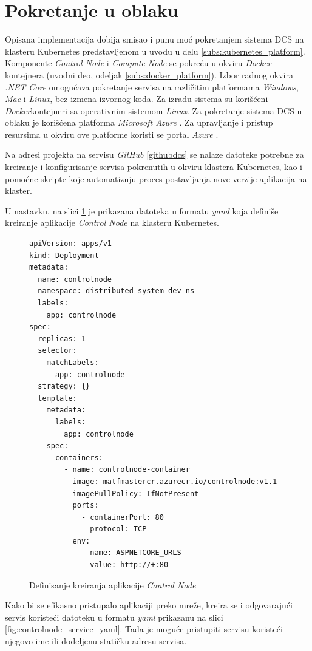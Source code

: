 \documentclass[12pt,oneside]{memoir}
\begin{document}
\section{Pokretanje u oblaku}

Opisana implementacija dobija smisao i punu moć pokretanjem sistema DCS na klasteru Kubernetes predstavljenom u uvodu u delu \ref{subs:kubernetes_platform}. Komponente \emph{Control Node} i \emph{Compute Node} se pokreću u okviru \emph{Docker} kontejnera (uvodni deo, odeljak \ref{subs:docker_platform}). Izbor radnog okvira \emph{.NET Core} omogućava pokretanje servisa na različitim platformama \emph{Windows}, \emph{Mac} i \emph{Linux}, bez izmena izvornog koda. Za izradu sistema su korišćeni \emph{Docker}kontejneri sa operativnim sistemom \emph{Linux}. Za pokretanje sistema DCS u oblaku je korišćena platforma \emph{Microsoft Azure} \cite{Azure}. Za upravljanje i pristup resursima u okviru ove platforme koristi se portal \emph{Azure} \cite{AzurePortal}.

Na adresi projekta na servisu \emph{GitHub} \ref{githubdcs} se nalaze datoteke potrebne za kreiranje i konfigurisanje servisa pokrenutih u okviru klastera Kubernetes, kao i pomoćne skripte koje automatizuju proces postavljanja nove verzije aplikacija na klaster.

U nastavku, na slici \ref{fig:controlnode_yaml} je prikazana datoteka u formatu \emph{yaml} koja definiše kreiranje aplikacije \emph{Control Node} na klasteru Kubernetes.

\begin{figure}[h!]
\centering
\begin{lstlisting}[style=yaml]
apiVersion: apps/v1
kind: Deployment
metadata:
  name: controlnode
  namespace: distributed-system-dev-ns
  labels:
    app: controlnode
spec:
  replicas: 1
  selector:
    matchLabels:
      app: controlnode
  strategy: {}
  template:
    metadata:
      labels:
        app: controlnode
    spec:
      containers:
        - name: controlnode-container
          image: matfmastercr.azurecr.io/controlnode:v1.1
          imagePullPolicy: IfNotPresent
          ports:
            - containerPort: 80
              protocol: TCP
          env:
            - name: ASPNETCORE_URLS
              value: http://+:80
\end{lstlisting}
\caption{Definisanje kreiranja aplikacije \emph{Control Node}}
\label{fig:controlnode_yaml}
\end{figure}

Kako bi se efikasno pristupalo aplikaciji preko mreže, kreira se i odgovarajući servis koristeći datoteku u formatu \emph{yaml} prikazanu na slici \ref{fig:controlnode_service_yaml}. Tada je moguće pristupiti servisu koristeći njegovo ime ili dodeljenu statičku adresu servisa.
\end{document}
